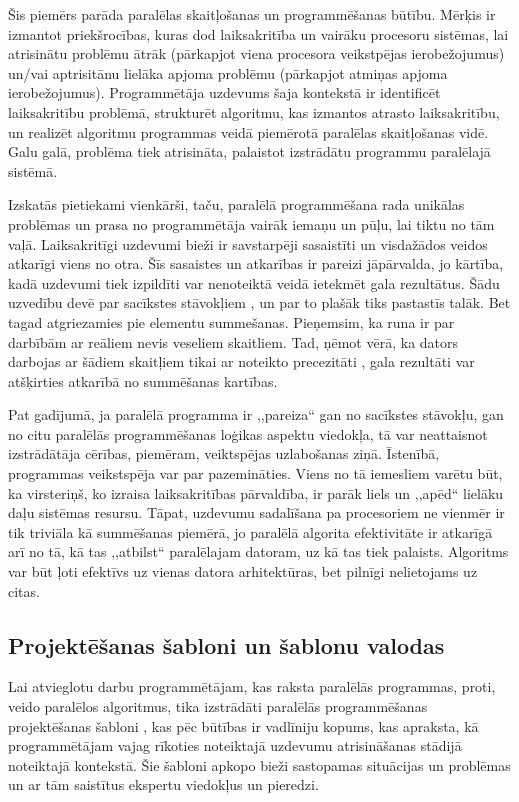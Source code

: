 
Šis piemērs parāda paralēlas skaitļošanas un programmēšanas būtību. Mērķis
ir izmantot priekšrocības, kuras dod laiksakritība un vairāku procesoru sistēmas,
lai atrisinātu problēmu ātrāk (pārkapjot viena procesora veikstpējas ierobežojumus)
un/vai aptrisitānu lielāka apjoma problēmu (pārkapjot atmiņas apjoma ierobežojumus).
Programmētāja uzdevums
šaja kontekstā ir identificēt laiksakritību problēmā, strukturēt algoritmu,
kas izmantos atrasto laiksakritību, un realizēt algoritmu programmas veidā
piemērotā paralēlas skaitļošanas vidē. Galu galā, problēma tiek atrisināta,
palaistot izstrādātu programmu paralēlajā sistēmā.

Izskatās pietiekami vienkārši, taču, paralēlā programmēšana rada unikālas
problēmas un prasa no programmētāja vairāk iemaņu un pūļu, lai tiktu no
tām vaļā. Laiksakritīgi uzdevumi bieži ir savstarpēji sasaistīti un
visdažādos veidos atkarīgi viens no otra. Šīs sasaistes un atkarības ir
pareizi jāpārvalda, jo kārtība, kadā uzdevumi tiek izpildīti var nenoteiktā
veidā ietekmēt gala rezultātus. Šādu uzvedību devē par sacīkstes stāvokļiem
, un par to plašāk tiks pastastīs talāk. Bet tagad atgriezamies
pie elementu summešanas. Pieņemsim, ka runa ir par darbībām ar reāliem nevis
veseliem skaitliem. Tad, ņēmot vērā, ka dators darbojas ar šādiem skaitļiem tikai
ar noteikto precezitāti , gala rezultāti var atšķirties atkarībā
no summēšanas kartības.

Pat gadījumā, ja paralēlā programma ir ,,pareiza`` gan no sacīkstes stāvokļu,
gan no citu paralēlās programmēšanas loģikas aspektu viedokļa, tā var neattaisnot
izstrādātāja cērības, piemēram, veiktspējas uzlabošanas ziņā. Īstenībā, programmas
veikstspēja var par pazemināties. Viens no tā iemesliem varētu būt, ka virsteriņš,
ko izraisa laiksakritības pārvaldība, ir parāk liels un ,,apēd`` lielāku daļu
sistēmas resursu. Tāpat, uzdevumu sadalīšana pa procesoriem ne vienmēr ir tik
triviāla kā summēšanas piemērā, jo paralēlā algorita efektivitāte ir atkarīgā arī
no tā, kā tas ,,atbilst`` paralēlajam datoram, uz kā tas tiek palaists. Algoritms
var būt ļoti efektīvs uz vienas datora arhitektūras, bet pilnīgi nelietojams uz citas.

\subsection{Projektēšanas šabloni un šablonu valodas}
Lai atvieglotu darbu programmētājam, kas raksta paralēlās programmas, proti,
veido paralēlos algoritmus, tika izstrādāti paralēlās programmēšanas projektēšanas
šabloni , kas pēc būtības ir
vadlīniju kopums, kas apraksta, kā programmētājam vajag rīkoties noteiktajā uzdevumu
atrisināšanas stādijā noteiktajā kontekstā. Šie šabloni apkopo bieži sastopamas
situācijas un problēmas un ar tām saistītus ekspertu viedokļus un pieredzi.

